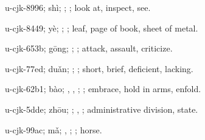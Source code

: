 \begin{multicols}{2}
{\cjkgGlue{}u-cjk-8996; shì; \cjkgGlue{}\cjkgGlue{}\cjkgGlue{}; \cjkgGlue{}; look at, inspect, see.

\cjkgGlue{}u-cjk-8449; yè; \cjkgGlue{}; \cjkgGlue{}; leaf, page of book, sheet of metal.

\cjkgGlue{}u-cjk-653b; gōng; \cjkgGlue{}\cjkgGlue{}\cjkgGlue{}; \cjkgGlue{}; attack, assault, criticize.

\cjkgGlue{}u-cjk-77ed; duǎn; \cjkgGlue{}\cjkgGlue{}\cjkgGlue{}; \cjkgGlue{}; short, brief, deficient, lacking.

\cjkgGlue{}u-cjk-62b1; bào; \cjkgGlue{}\cjkgGlue{}\cjkgGlue{}, \cjkgGlue{}\cjkgGlue{}\cjkgGlue{}, \cjkgGlue{}\cjkgGlue{}\cjkgGlue{}; \cjkgGlue{}; embrace, hold in arms, enfold.

\cjkgGlue{}u-cjk-5dde; zhōu; \cjkgGlue{}; \cjkgGlue{}, \cjkgGlue{}; administrative division, state.

\cjkgGlue{}u-cjk-99ac; mǎ; \cjkgGlue{}, \cjkgGlue{}; \cjkgGlue{}; horse.

}
\end{multicols}
